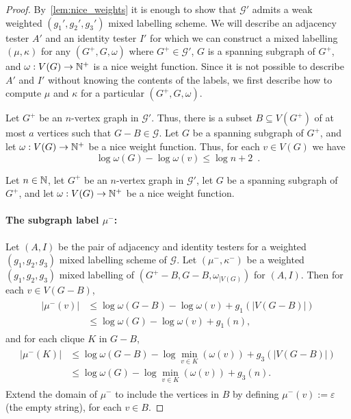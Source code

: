 \documentclass{patmorin}
\renewcommand{\le}{\leqslant}
\begin{document}
  \begin{proof}
    By~\cref{lem:nice_weights} it is enough to show that $\mathcal{G}'$ admits a weak weighted $(g_1',g_2',g_3')$ mixed labelling scheme. We will describe an adjacency tester $A'$ and an identity tester $I'$ for which we can construct a mixed labelling $(\mu,\kappa)$ for any $(G^+,G,\omega)$ where $G^+\in\mathcal{G}'$, $G$ is a spanning subgraph of $G^+$, and $\omega:V(G)\to\mathbb{N}^+$ is a nice weight function.
    Since it is not possible to describe $A'$ and $I'$ without knowing the contents of the labels, we first describe how to compute $\mu$ and $\kappa$ for a particular $(G^+,G,\omega)$.

    Let $G^+$ be an $n$-vertex graph in $\mathcal{G}'$.  Thus, there is a subset $B\subseteq V(G^+)$ of at most $a$ vertices such that $G-B\in\mathcal{G}$.  Let $G$ be a spanning subgraph of $G^+$, and let $\omega:V(G)\to\mathbb{N}^+$ be a nice weight function.
    Thus, for each $v\in V(G)$ we have
    \begin{equation}
      \log\omega(G)-\log\omega(v)\le\log n + 2\enspace.
    \end{equation}

    Let $n\in \mathbb{N}$,
    let $G^+$ be an $n$-vertex graph in $\mathcal{G}'$,
    let $G$ be a spanning subgraph of $G^+$,
    and
    let $\omega:V(G)\to\mathbb{N}^+$ be a nice weight function.


    \paragraph{\boldmath The subgraph label $\mu^-$:}
    Let $(A,I)$ be the pair of adjacency and identity testers for a weighted $(g_1,g_2,g_3)$ mixed labelling scheme of $\mathcal{G}$.
    Let $(\mu^-,\kappa^-)$ be a weighted $(g_1,g_2,g_3)$ mixed labelling of $(G^+-B, G-B,\omega_{|V(G)})$ for $(A,I)$.
  Then for each $v\in V(G-B)$,
  \begin{align}
  \begin{split}
  |\mu^-(v)|
  &\le \log\omega(G-B) -\log\omega(v)+g_1(|V(G-B)|)\\
  &\le \log\omega(G)-\log\omega(v)+g_1(n),
  \end{split}
  \label{eq:mu-}
  \end{align}
  and for each clique $K$ in $G-B$,
  \begin{align}
  \label{eq:split}
  \begin{split}
  |\mu^-(K)|
  &\le \log\omega(G-B)-\log\min_{v\in K}(\omega(v))+g_3(|V(G-B)|)\\
  &\le \log\omega(G)-\log\min_{v\in K}(\omega(v))+g_3(n).
  \end{split}
  \end{align}
  Extend the domain of $\mu^-$ to include the vertices in $B$ by defining $\mu^-(v):=\varepsilon$ (the empty string), for each $v\in B$.


\end{proof}
\end{document}
